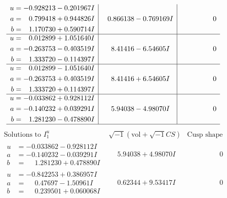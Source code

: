\documentclass[1p]{elsarticle_modified}
\theoremstyle{definition}
\newcommand{\I}{\sqrt{-1}}
\begin{document}
$$\begin{array}{c|c|c}
\begin{aligned}
u &= -0.928213 - 0.201967 I \\
a &= \phantom{-}0.799418 + 0.944826 I \\
b &= \phantom{-}1.170730 + 0.590714 I\end{aligned}
 & \phantom{-}0.866138 - 0.769169 I & \phantom{-0.000000 } 0 \\ \hline\begin{aligned}
u &= \phantom{-}0.012899 + 1.051640 I \\
a &= -0.263753 - 0.403519 I \\
b &= \phantom{-}1.333720 - 0.114397 I\end{aligned}
 & \phantom{-}8.41416 - 6.54605 I & \phantom{-0.000000 } 0 \\ \hline\begin{aligned}
u &= \phantom{-}0.012899 - 1.051640 I \\
a &= -0.263753 + 0.403519 I \\
b &= \phantom{-}1.333720 + 0.114397 I\end{aligned}
 & \phantom{-}8.41416 + 6.54605 I & \phantom{-0.000000 } 0 \\ \hline\begin{aligned}
u &= -0.033862 + 0.928112 I \\
a &= -0.140232 + 0.039291 I \\
b &= \phantom{-}1.281230 - 0.478890 I\end{aligned}
 & \phantom{-}5.94038 - 4.98070 I & \phantom{-0.000000 } 0\\
 \hline 
 \end{array}$$\newpage$$\begin{array}{c|c|c}  
\text{Solutions to }I^u_{1}& \I (\text{vol} + \sqrt{-1}CS) & \text{Cusp shape}\\
 \hline 
\begin{aligned}
u &= -0.033862 - 0.928112 I \\
a &= -0.140232 - 0.039291 I \\
b &= \phantom{-}1.281230 + 0.478890 I\end{aligned}
 & \phantom{-}5.94038 + 4.98070 I & \phantom{-0.000000 } 0 \\ \hline\begin{aligned}
u &= -0.842253 + 0.386957 I \\
a &= \phantom{-}0.47697 - 1.50961 I \\
b &= \phantom{-}0.239501 + 0.060068 I\end{aligned}
 & \phantom{-}0.62344 + 9.53417 I & \phantom{-0.000000 } 0 \\ \hline\begin{aligned}

\end{aligned}
\end{array}$$
\end{document}
